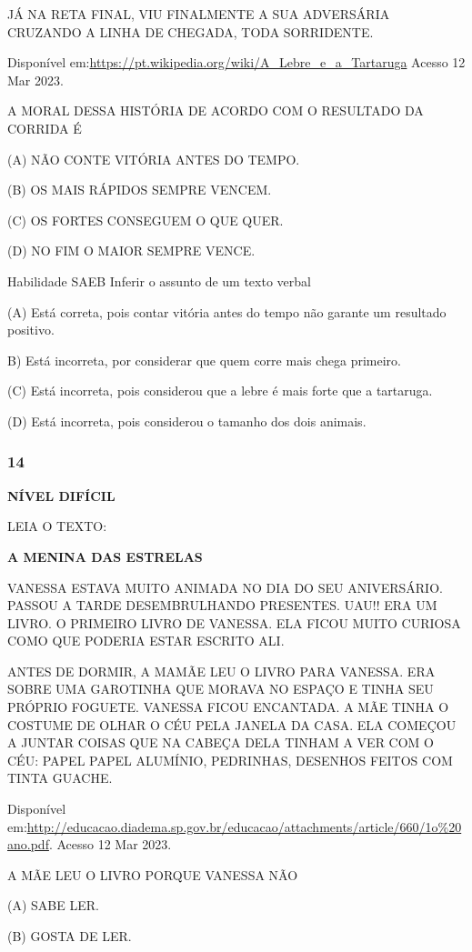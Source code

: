 JÁ NA RETA FINAL, VIU FINALMENTE A SUA ADVERSÁRIA CRUZANDO A LINHA DE
CHEGADA, TODA SORRIDENTE.

Disponível em:\url{https://pt.wikipedia.org/wiki/A_Lebre_e_a_Tartaruga}
Acesso 12 Mar 2023.

A MORAL DESSA HISTÓRIA DE ACORDO COM O RESULTADO DA CORRIDA É

(A) NÃO CONTE VITÓRIA ANTES DO TEMPO.

(B) OS MAIS RÁPIDOS SEMPRE VENCEM.

(C) OS FORTES CONSEGUEM O QUE QUER.

(D) NO FIM O MAIOR SEMPRE VENCE.

Habilidade SAEB Inferir o assunto de um texto verbal

(A) Está correta, pois contar vitória antes do tempo não garante um
resultado positivo.

B) Está incorreta, por considerar que quem corre mais chega primeiro.

(C) Está incorreta, pois considerou que a lebre é mais forte que a
tartaruga.

(D) Está incorreta, pois considerou o tamanho dos dois animais.

\subsubsection{14}\label{section-156}

\textbf{NÍVEL DIFÍCIL}

LEIA O TEXTO:

\textbf{A MENINA DAS ESTRELAS}

VANESSA ESTAVA MUITO ANIMADA NO DIA DO SEU ANIVERSÁRIO. PASSOU A TARDE
DESEMBRULHANDO PRESENTES. UAU!! ERA UM LIVRO. O PRIMEIRO LIVRO DE
VANESSA. ELA FICOU MUITO CURIOSA COMO QUE PODERIA ESTAR ESCRITO ALI.

ANTES DE DORMIR, A MAMÃE LEU O LIVRO PARA VANESSA. ERA SOBRE UMA
GAROTINHA QUE MORAVA NO ESPAÇO E TINHA SEU PRÓPRIO FOGUETE. VANESSA
FICOU ENCANTADA. A MÃE TINHA O COSTUME DE OLHAR O CÉU PELA JANELA DA
CASA. ELA COMEÇOU A JUNTAR COISAS QUE NA CABEÇA DELA TINHAM A VER COM O
CÉU: PAPEL PAPEL ALUMÍNIO, PEDRINHAS, DESENHOS FEITOS COM TINTA GUACHE.

Disponível
em:\url{http://educacao.diadema.sp.gov.br/educacao/attachments/article/660/1o\%20ano.pdf}.
Acesso 12 Mar 2023.

A MÃE LEU O LIVRO PORQUE VANESSA NÃO

(A) SABE LER.

(B) GOSTA DE LER.

